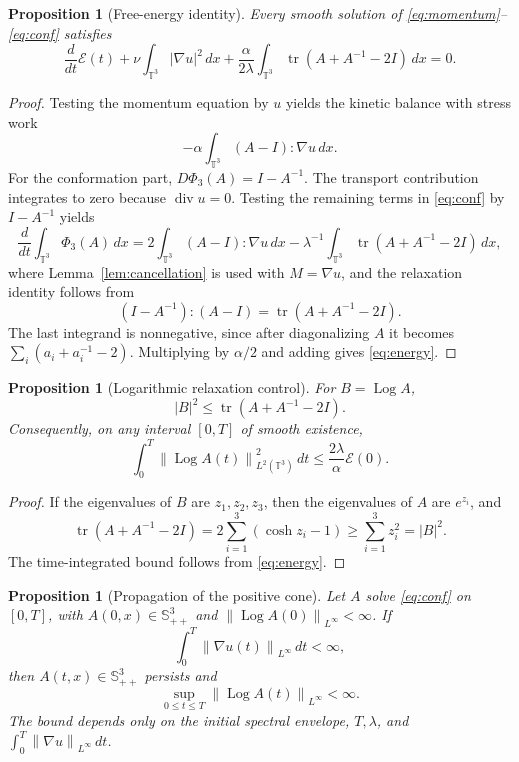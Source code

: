 \documentclass[11pt]{article}
\numberwithin{equation}{section}
\newtheorem{proposition}[theorem]{Proposition}
\newcommand{\T}{\mathbb T}
\newcommand{\Id}{I}
\newcommand{\Spp}{\mathbb S_{++}}
\newcommand{\tr}{\operatorname{tr}}
\newcommand{\divv}{\operatorname{div}}
\newcommand{\Log}{\operatorname{Log}}
\newcommand{\calE}{\mathcal E}
\newcommand{\norm}[1]{\left\lVert #1\right\rVert}
\begin{document}
\begin{proposition}[Free-energy identity]
\label{prop:energy}
Every smooth solution of \eqref{eq:momentum}--\eqref{eq:conf} satisfies
\begin{equation}
  \frac{d}{dt}\calE(t)
  +\nu\int_{\T^3}|\nabla u|^2\,dx
  +\frac{\alpha}{2\lambda}
  \int_{\T^3}\tr(A+A^{-1}-2\Id)\,dx
  =0 .
  \label{eq:energy}
\end{equation}
\end{proposition}

\begin{proof}
Testing the momentum equation by \(u\) yields the kinetic balance with stress
work
\[
  -\alpha\int_{\T^3}(A-\Id):\nabla u\,dx .
\]
For the conformation part, \(D\Phi_3(A)=\Id-A^{-1}\).  The transport
contribution integrates to zero because \(\divv u=0\).  Testing the remaining
terms in \eqref{eq:conf} by \(\Id-A^{-1}\) yields
\[
  \frac{d}{dt}\int_{\T^3}\Phi_3(A)\,dx
  =
  2\int_{\T^3}(A-\Id):\nabla u\,dx
  -\lambda^{-1}
  \int_{\T^3}\tr(A+A^{-1}-2\Id)\,dx ,
\]
where Lemma~\ref{lem:cancellation} is used with \(M=\nabla u\), and the
relaxation identity follows from
\[
  (\Id-A^{-1}):(A-\Id)=\tr(A+A^{-1}-2\Id).
\]
The last integrand is nonnegative, since after diagonalizing \(A\) it becomes
\(\sum_i(a_i+a_i^{-1}-2)\).  Multiplying by \(\alpha/2\) and adding gives
\eqref{eq:energy}.
\end{proof}

\begin{proposition}[Logarithmic relaxation control]
\label{prop:log-relax}
For \(B=\Log A\),
\begin{equation}
  |B|^2\le\tr(A+A^{-1}-2\Id).
  \label{eq:pointwise-log-control}
\end{equation}
Consequently, on any interval \([0,T]\) of smooth existence,
\begin{equation}
  \int_0^T\norm{\Log A(t)}_{L^2(\T^3)}^2\,dt
  \le
  \frac{2\lambda}{\alpha}\calE(0).
  \label{eq:log-L2-time}
\end{equation}
\end{proposition}

\begin{proof}
If the eigenvalues of \(B\) are \(z_1,z_2,z_3\), then the eigenvalues of \(A\)
are \(e^{z_i}\), and
\[
  \tr(A+A^{-1}-2\Id)
  =
  2\sum_{i=1}^3(\cosh z_i-1)
  \ge \sum_{i=1}^3z_i^2=|B|^2 .
\]
The time-integrated bound follows from \eqref{eq:energy}.
\end{proof}

\begin{proposition}[Propagation of the positive cone]
\label{prop:cone}
Let \(A\) solve \eqref{eq:conf} on \([0,T]\), with
\(A(0,x)\in\Spp^3\) and \(\norm{\Log A(0)}_{L^\infty}<\infty\).  If
\[
  \int_0^T\norm{\nabla u(t)}_{L^\infty}\,dt<\infty,
\]
then \(A(t,x)\in\Spp^3\) persists and
\[
  \sup_{0\le t\le T}\norm{\Log A(t)}_{L^\infty}<\infty .
\]
The bound depends only on the initial spectral envelope, \(T,\lambda\), and
\(\int_0^T\norm{\nabla u}_{L^\infty}\,dt\).
\end{proposition}
\end{document}
